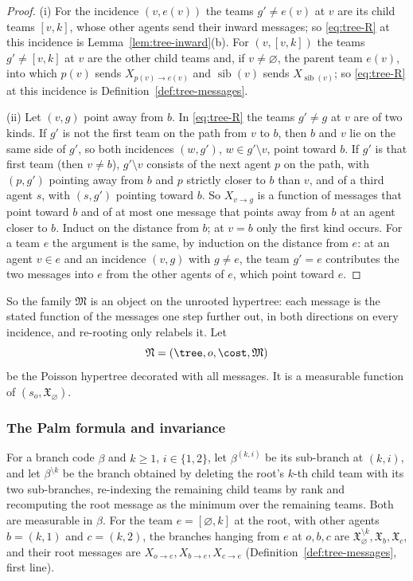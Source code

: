 \begin{proof}
(i) For the incidence $(v,e(v))$ the teams $g'\ne e(v)$ at $v$ are its child teams $[v,k]$,
whose other agents send their inward messages; so \eqref{eq:tree-R} at this incidence is
Lemma~\ref{lem:tree-inward}(b). For $(v,[v,k])$ the teams $g'\ne[v,k]$ at $v$ are the other
child teams and, if $v\ne\varnothing$, the parent team $e(v)$, into which $p(v)$ sends
$X_{p(v)\to e(v)}$ and $\operatorname{sib}(v)$ sends $X_{\operatorname{sib}(v)}$; so
\eqref{eq:tree-R} at this incidence is Definition~\ref{def:tree-messages}.

(ii) Let $(v,g)$ point away from $b$. In \eqref{eq:tree-R} the teams $g'\ne g$ at $v$ are of
two kinds. If $g'$ is not the first team on the path from $v$ to $b$, then $b$ and $v$ lie on
the same side of $g'$, so both incidences $(w,g')$, $w\in g'\setminus v$, point toward $b$. If
$g'$ is that first team (then $v\ne b$), $g'\setminus v$ consists of the next agent $p$ on the
path, with $(p,g')$ pointing away from $b$ and $p$ strictly closer to $b$ than $v$, and of a
third agent $s$, with $(s,g')$ pointing toward $b$. So $X_{v\to g}$ is a function of messages
that point toward $b$ and of at most one message that points away from $b$ at an agent closer
to $b$. Induct on the distance from $b$; at $v=b$ only the first kind occurs. For a team $e$
the argument is the same, by induction on the distance from $e$: at an agent $v\in e$ and an
incidence $(v,g)$ with $g\ne e$, the team $g'=e$ contributes the two messages into $e$ from the
other agents of $e$, which point toward $e$.
\end{proof}

So the family $\mathfrak{M}$ is an object on the unrooted hypertree: each message is the
stated function of the messages one step further out, in both directions on every incidence,
and re-rooting only relabels it. Let
\[
  \mathfrak{N}=(\tree,o,\cost,\mathfrak{M})
\]
be the Poisson hypertree decorated with all messages. It is a measurable function of
$(s_o,\mathfrak{X}_\varnothing)$.

\subsubsection*{The Palm formula and invariance}

For a branch code $\beta$ and $k\ge1$, $i\in\{1,2\}$, let $\beta^{(k,i)}$ be its sub-branch at
$(k,i)$, and let $\beta^{\setminus k}$ be the branch obtained by deleting the root's $k$-th
child team with its two sub-branches, re-indexing the remaining child teams by rank and
recomputing the root message as the minimum over the remaining teams. Both are measurable in
$\beta$. For the team $e=[\varnothing,k]$ at the root, with other agents $b=(k,1)$ and
$c=(k,2)$, the branches hanging from $e$ at $o,b,c$ are
$\mathfrak{X}_\varnothing^{\setminus k},\mathfrak{X}_b,\mathfrak{X}_c$, and their root messages
are $X_{o\to e},X_{b\to e},X_{c\to e}$ (Definition~\ref{def:tree-messages}, first line).

